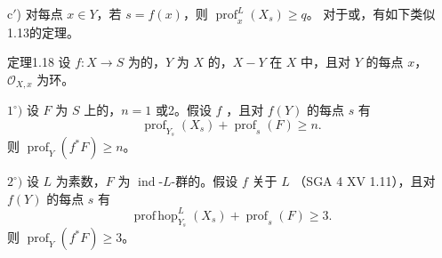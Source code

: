 c$'$) 对每点 $x\in Y$，若 $s=f(x)$，则 $\operatorname{prof}_x^L(X_s)\geq q$。
对于或，有如下类似1.13的定理。
\begin{SGAresult}{定理}{1.18}
设 $f:X\to S$ 为的，$Y$ 为 $X$ 的，$X-Y$ 在 $X$ 中，且对 $Y$ 的每点 $x$， $\mathcal O_{X,x}$ 为环。

$1^\circ)$ 设 $F$ 为 $S$ 上的，$n=1$ 或2。假设 $f$ ，且对 $f(Y)$ 的每点 $s$ 有
\[\operatorname{prof}_{Y_s}(X_s)+\operatorname{prof}_s(F)\geq n.\]
则 $\operatorname{prof}_Y(f^*F)\geq n$。

$2^\circ)$ 设 $L$ 为素数，$F$ 为 $\operatorname{ind}$-$L$-群的。假设 $f$ 关于 $L$ （SGA 4 XV 1.11），且对 $f(Y)$ 的每点 $s$ 有
\[\operatorname{prof\,hop}_{Y_s}^L(X_s)+\operatorname{prof}_s(F)\geq3.\]
则 $\operatorname{prof}_Y(f^*F)\geq3$。
\end{SGAresult}
